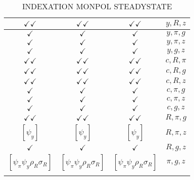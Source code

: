 \documentclass[a4paper,10pt]{article}
\begin{document}
\begin{longtable}{|c|c|c|c|}
\hline
$\checkmark\checkmark$ & $\checkmark\checkmark$ & $\checkmark\checkmark$ & ${y},{R},{z}$ \\
\hline
$\checkmark$ & $\checkmark$ & $\checkmark$ & ${y},{\pi},{g}$ \\
\hline
$\checkmark$ & $\checkmark$ & $\checkmark$ & ${y},{\pi},{z}$ \\
\hline
$\checkmark$ & $\checkmark$ & $\checkmark$ & ${y},{g},{z}$ \\
\hline
$\checkmark\checkmark$ & $\checkmark\checkmark$ & $\checkmark\checkmark$ & ${c},{R},{\pi}$ \\
\hline
$\checkmark\checkmark$ & $\checkmark\checkmark$ & $\checkmark\checkmark$ & ${c},{R},{g}$ \\
\hline
$\checkmark\checkmark$ & $\checkmark\checkmark$ & $\checkmark\checkmark$ & ${c},{R},{z}$ \\
\hline
$\checkmark$ & $\checkmark$ & $\checkmark$ & ${c},{\pi},{g}$ \\
\hline
$\checkmark$ & $\checkmark$ & $\checkmark$ & ${c},{\pi},{z}$ \\
\hline
$\checkmark$ & $\checkmark$ & $\checkmark$ & ${c},{g},{z}$ \\
\hline
$\checkmark\checkmark$ & $\checkmark\checkmark$ & $\checkmark\checkmark$ & ${R},{\pi},{g}$ \\
\hline
$[\psi_y ]$ & $[\psi_y ]$ & $[\psi_y ]$ & ${R},{\pi},{z}$ \\
\hline
$\checkmark$ & $\checkmark$ & $\checkmark$ & ${R},{g},{z}$ \\
\hline
$[\psi_\pi \psi_y \rho_R \sigma_R ]$ & $[\psi_\pi \psi_y \rho_R \sigma_R ]$ & $[\psi_\pi \psi_y \rho_R \sigma_R ]$ & ${\pi},{g},{z}$ \\
\hline
\caption{INDEXATION MONPOL STEADYSTATE}
\label{table:MyTableLabel}
\end{longtable}
\end{document}
